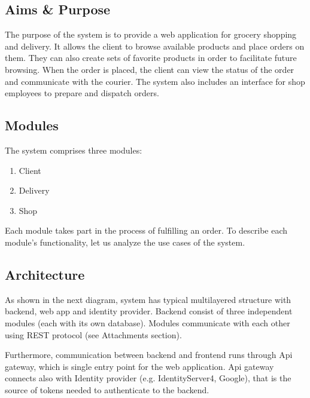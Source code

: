 \documentclass[../main.tex]{subfiles}
\begin{document}
\subsection{Aims \& Purpose}
The purpose of the system is to provide a web application for grocery shopping and delivery. It allows the client to browse available products and place orders on them. They can also create sets of favorite products in order to facilitate future browsing. When the order is placed, the client can view the status of the order and communicate with the courier. The system also includes an interface for shop employees to prepare and dispatch orders.

\subsection{Modules}
The system comprises three modules:
\begin{enumerate}
    \item Client %
    \item Delivery %
    \item Shop %
\end{enumerate}

Each module takes part in the process of fulfilling an order. To describe each module's functionality, let us analyze the use cases of the system.

\subsection{Architecture}



As shown in the next diagram, system has typical multilayered structure with backend, web app and identity provider. Backend consist of three independent modules (each with its own database). Modules communicate with each other using REST protocol (see Attachments section).

Furthermore, communication between backend and frontend runs through Api gateway, which is single entry point for the web application. Api gateway connects also with Identity provider (e.g. IdentityServer4, Google), that is the source of tokens needed to authenticate to the backend.
\end{document}
